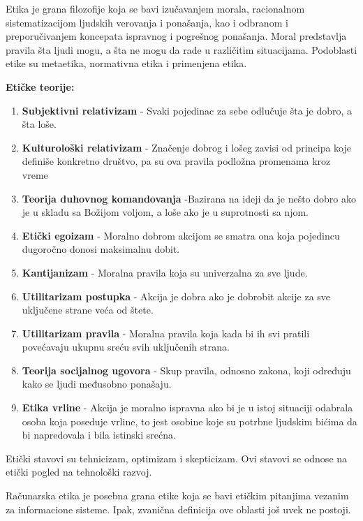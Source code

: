 \documentclass{article}
\begin{document}
Etika je grana filozofije koja se bavi izučavanjem morala, racionalnom sistematizacijom ljudskih verovanja i ponašanja, kao i odbranom i preporučivanjem koncepata ispravnog i pogrešnog ponašanja. Moral predstavlja pravila šta ljudi mogu, a šta ne mogu da rade u različitim situacijama. Podoblasti etike su metaetika, normativna etika i primenjena etika.

\textbf{Etičke teorije:}

\begin{enumerate}[label=\textbf{\arabic*.}]
    \item \textbf{Subjektivni relativizam} - Svaki pojedinac za sebe odlučuje šta je dobro, a šta loše.
    \item \textbf{Kulturološki relativizam} - Značenje dobrog i lošeg zavisi od principa koje definiše konkretno društvo, pa su ova pravila podložna promenama kroz vreme
    \item \textbf{Teorija duhovnog komandovanja} -Bazirana na ideji da je nešto dobro ako je u skladu sa Božijom voljom, a loše ako je u suprotnosti sa njom.
    \item \textbf{Etički egoizam} - Moralno dobrom akcijom se smatra ona koja pojedincu dugoročno donosi maksimalnu dobit.
    \item \textbf{Kantijanizam} - Moralna pravila koja su univerzalna za sve ljude.
    \item \textbf{Utilitarizam postupka} - Akcija je dobra ako je dobrobit akcije za sve uključene strane veća od štete.
    \item \textbf{Utilitarizam pravila} - Moralna pravila koja kada bi ih svi pratili povećavaju ukupnu sreću svih uključenih strana.
    \item \textbf{Teorija socijalnog ugovora} - Skup pravila, odnosno zakona, koji određuju kako se ljudi međusobno ponašaju.
    \item \textbf{Etika vrline} - Akcija je moralno ispravna ako bi je u istoj situaciji odabrala osoba koja poseduje vrline, to jest osobine koje su potrbne ljudskim bićima da bi napredovala i bila istinski srećna.
\end{enumerate}

Etički stavovi su  tehnicizam, optimizam i skepticizam. Ovi stavovi se odnose na etički pogled na tehnološki razvoj. 

Računarska etika je posebna grana etike koja se bavi etičkim pitanjima vezanim za informacione sisteme. Ipak, zvanična definicija ove oblasti još uvek ne postoji.
\end{document}
